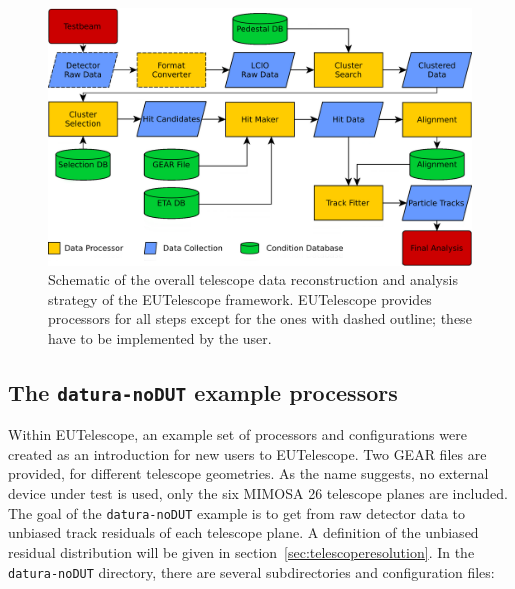 \begin{figure}[tbp]
	\center
	\includegraphics[width=.9\textwidth]{figures/eutel-strategy.png}
	\caption[The EUTelescope data analysis strategy]{Schematic of the overall telescope data reconstruction and analysis strategy of the EUTelescope framework. 
	EUTelescope provides processors for all steps except for the ones with dashed outline; these have to be implemented by the user.}
	\label{fig:offline:strategy}
\end{figure}

\subsection{The \texttt{datura-noDUT} example processors}
\label{sec:datura-nodut}

Within EUTelescope, an example set of processors and configurations were created
as an introduction for new users to EUTelescope. Two GEAR files are provided,
for different telescope geometries. As the name suggests, no external device
under test is used, only the six MIMOSA 26 telescope planes are included. The
goal of the \texttt{datura-noDUT} example is to get from raw detector data to
unbiased track residuals of each telescope plane. A definition of the unbiased
residual distribution will be given in section~\ref{sec:telescoperesolution}. In
the \texttt{datura-noDUT} directory, there are several subdirectories and
configuration files:

